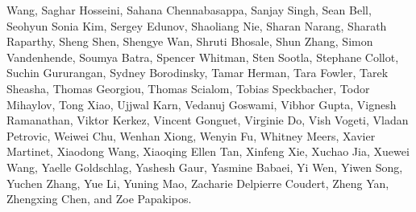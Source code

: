 Wang, Saghar Hosseini, Sahana Chennabasappa, Sanjay Singh, Sean Bell, Seohyun Sonia Kim, Sergey Edunov, Shaoliang Nie, Sharan Narang, Sharath Raparthy, Sheng Shen, Shengye Wan, Shruti Bhosale, Shun Zhang, Simon Vandenhende, Soumya Batra, Spencer Whitman, Sten Sootla, Stephane Collot, Suchin Gururangan, Sydney Borodinsky, Tamar Herman, Tara Fowler, Tarek Sheasha, Thomas Georgiou, Thomas Scialom, Tobias Speckbacher, Todor Mihaylov, Tong Xiao, Ujjwal Karn, Vedanuj Goswami, Vibhor Gupta, Vignesh Ramanathan, Viktor Kerkez, Vincent Gonguet, Virginie Do, Vish Vogeti, Vladan Petrovic, Weiwei Chu, Wenhan Xiong, Wenyin Fu, Whitney Meers, Xavier Martinet, Xiaodong Wang, Xiaoqing Ellen Tan, Xinfeng Xie, Xuchao Jia, Xuewei Wang, Yaelle Goldschlag, Yashesh Gaur, Yasmine Babaei, Yi Wen, Yiwen Song, Yuchen Zhang, Yue Li, Yuning Mao, Zacharie Delpierre Coudert, Zheng Yan, Zhengxing Chen, and Zoe Papakipos.

